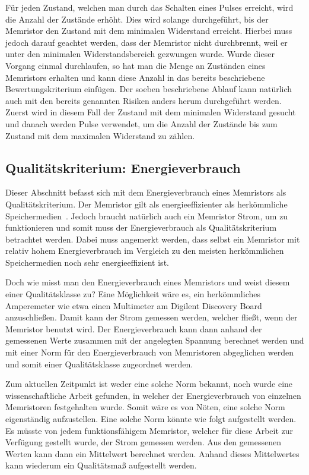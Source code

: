   Für jeden Zustand, welchen man durch das Schalten eines Pulses erreicht, wird die Anzahl der Zustände erhöht. Dies wird solange durchgeführt, bis der Memristor den Zustand mit dem minimalen Widerstand erreicht. Hierbei muss jedoch darauf geachtet werden, dass der Memristor nicht durchbrennt, weil er unter den minimalen Widerstandsbereich gezwungen wurde. Wurde dieser Vorgang einmal durchlaufen, so hat man die Menge an Zuständen eines Memristors erhalten und kann diese Anzahl in das bereits beschriebene Bewertungskriterium einfügen. Der soeben beschriebene Ablauf kann natürlich auch mit den bereits genannten Risiken anders herum durchgeführt werden. Zuerst wird in diesem Fall der Zustand mit dem minimalen Widerstand gesucht und danach werden Pulse verwendet, um die Anzahl der Zustände bis zum Zustand mit dem maximalen Widerstand zu zählen.

\subsection{Qualitätskriterium: Energieverbrauch}
  Dieser Abschnitt befasst sich mit dem Energieverbrauch eines Memristors als Qualitätskriterium. Der Memristor gilt als energieeffizienter als herkömmliche Speichermedien~\cite{nonvolatile}.
  Jedoch braucht natürlich auch ein Memristor Strom, um zu funktionieren und somit muss der Energieverbrauch als Qualitätskriterium betrachtet werden. Dabei muss angemerkt werden, dass selbst ein Memristor mit relativ hohem Energieverbrauch im Vergleich zu den meisten herkömmlichen Speichermedien noch sehr energieeffizient ist.

  Doch wie misst man den Energieverbrauch eines Memristors und weist diesem einer Qualitätsklasse zu? Eine Möglichkeit wäre es, ein herkömmliches Amperemeter wie etwa einen Multimeter am Digilent Discovery Board anzuschließen. Damit kann der Strom gemessen werden, welcher fließt, wenn der Memristor benutzt wird. Der Energieverbrauch kann dann anhand der gemessenen Werte zusammen mit der angelegten Spannung berechnet werden und mit einer Norm für den Energieverbrauch von Memristoren abgeglichen werden und somit einer Qualitätsklasse zugeordnet werden.

  Zum aktuellen Zeitpunkt ist weder eine solche Norm bekannt, noch wurde eine wissenschaftliche Arbeit gefunden, in welcher der Energieverbrauch von einzelnen Memristoren festgehalten wurde. Somit wäre es von Nöten, eine solche Norm eigenständig aufzustellen. Eine solche Norm könnte wie folgt aufgestellt werden. Es müsste von jedem funktionsfähigem Memristor, welcher für diese Arbeit zur Verfügung gestellt wurde, der Strom gemessen werden. Aus den gemessenen Werten kann dann ein Mittelwert berechnet werden. Anhand dieses Mittelwertes kann wiederum ein Qualitätsmaß aufgestellt werden.

